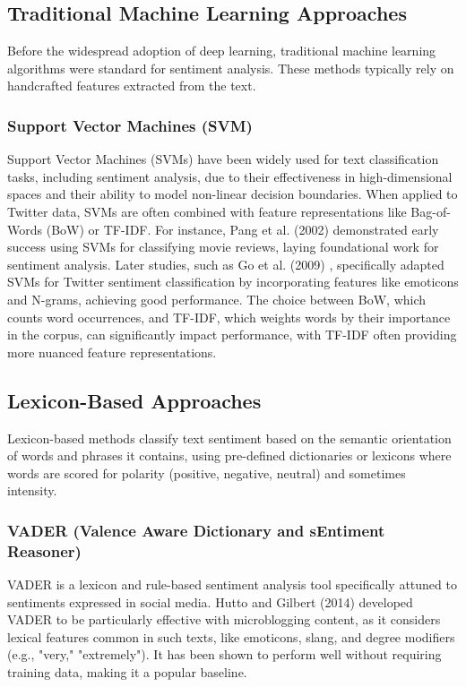 \subsection{Traditional Machine Learning Approaches}

Before the widespread adoption of deep learning, traditional machine learning algorithms were standard for sentiment analysis. These methods typically rely on handcrafted features extracted from the text.


\subsubsection{Support Vector Machines (SVM)}

Support Vector Machines (SVMs) have been widely used for text classification tasks, including sentiment analysis, due to their effectiveness in high-dimensional spaces and their ability to model non-linear decision boundaries. When applied to Twitter data, SVMs are often combined with feature representations like Bag-of-Words (BoW) or TF-IDF. For instance, Pang et al. (2002) \cite{pang2002thumbs}  demonstrated early success using SVMs for classifying movie reviews, laying foundational work for sentiment analysis. Later studies, such as Go et al. (2009) \cite{go2009twitter}, specifically adapted SVMs for Twitter sentiment classification by incorporating features like emoticons and N-grams, achieving good performance. The choice between BoW, which counts word occurrences, and TF-IDF, which weights words by their importance in the corpus, can significantly impact performance, with TF-IDF often providing more nuanced feature representations.


\subsection{Lexicon-Based Approaches}

Lexicon-based methods classify text sentiment based on the semantic orientation of words and phrases it contains, using pre-defined dictionaries or lexicons where words are scored for polarity (positive, negative, neutral) and sometimes intensity.


\subsubsection{VADER (Valence Aware Dictionary and sEntiment Reasoner)
}

VADER is a lexicon and rule-based sentiment analysis tool specifically attuned to sentiments expressed in social media. Hutto and Gilbert (2014) \cite{hutto2014vader} developed VADER to be particularly effective with microblogging content, as it considers lexical features common in such texts, like emoticons, slang, and degree modifiers (e.g., "very," "extremely"). It has been shown to perform well without requiring training data, making it a popular baseline.

